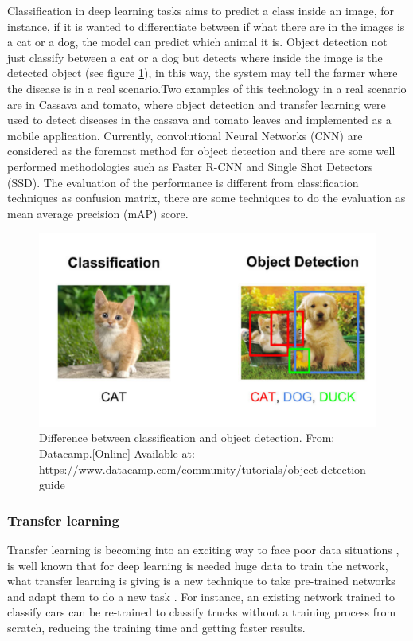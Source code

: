 Classification in deep learning tasks aims to predict a class inside an image, for instance, if it is wanted to differentiate between if what there are in the images is a cat or a dog, the model can predict which animal it is. Object detection not just classify between a cat or a dog but detects where inside the image is the detected object (see figure \ref{fig:Spectral_Signature}), in this way, the system may tell the farmer where the disease is in a real scenario\cite{article}.Two examples of this technology in a real scenario are in Cassava and tomato, where object detection and transfer learning were used to detect diseases in the cassava and tomato leaves\cite{ramcharan}\cite{article} and implemented as a mobile application\cite{ramcharan2017using}. Currently, convolutional Neural Networks (CNN) are considered as the foremost method for object detection and there are some well performed methodologies such as Faster R-CNN and Single Shot Detectors (SSD). The evaluation of the performance is different from classification techniques as confusion matrix, there are some techniques to do the evaluation as mean average precision (mAP) score.

\begin{figure}[h]
\centering
\includegraphics[scale=0.4]{Figures/object.pdf}
\caption{Difference between classification and object detection. From: Datacamp.[Online] Available at: https://www.datacamp.com/community/tutorials/object-detection-guide}
\label{fig:Spectral_Signature}
\end{figure}

\subsubsection{Transfer learning}

Transfer learning is becoming into an exciting way to face poor data situations \cite{pan2010survey}, is well known that for deep learning is needed huge data to train the network, what transfer learning is giving is a new technique to take pre-trained networks and adapt them to do a new task \cite{torrey2010transfer}. For instance, an existing network trained to classify cars can be re-trained to classify trucks without a training process from scratch, reducing the training time and getting faster results. 

